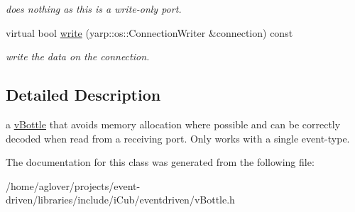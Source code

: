 \begin{DoxyCompactItemize}
\begin{DoxyCompactList}\small\item\em does nothing as this is a write-\/only port. \end{DoxyCompactList}\item 
virtual bool \hyperlink{classev_1_1vBottleMimic_a49b7afc18d0471d8683658d045c70be5}{write} (yarp\+::os\+::\+Connection\+Writer \&connection) const \hypertarget{classev_1_1vBottleMimic_a49b7afc18d0471d8683658d045c70be5}{}\label{classev_1_1vBottleMimic_a49b7afc18d0471d8683658d045c70be5}

\begin{DoxyCompactList}\small\item\em write the data on the connection. \end{DoxyCompactList}\end{DoxyCompactItemize}


\subsection{Detailed Description}
a \hyperlink{classev_1_1vBottle}{v\+Bottle} that avoids memory allocation where possible and can be correctly decoded when read from a receiving port. Only works with a single event-\/type. 

The documentation for this class was generated from the following file\+:\begin{DoxyCompactItemize}
\item 
/home/aglover/projects/event-\/driven/libraries/include/i\+Cub/eventdriven/v\+Bottle.\+h\end{DoxyCompactItemize}
